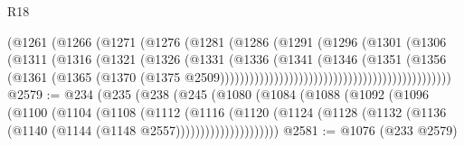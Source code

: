 \begin{lexlean}{R18}
\begin{coremodule}
                                                  (@1261
                                                    (@1266
                                                      (@1271
                                                        (@1276
                                                          (@1281
                                                            (@1286
                                                              (@1291
                                                                (@1296
                                                                  (@1301
                                                                    (@1306
                                                                      (@1311
                                                                        (@1316
                                                                          (@1321
                                                                            (@1326
                                                                              (@1331
                                                                                (@1336
                                                                                  (@1341
                                                                                    (@1346
                                                                                      (@1351
                                                                                        (@1356
                                                                                          (@1361
                                                                                            (@1365
                                                                                              (@1370
                                                                                                (@1375
                                                                                                  @2509)))))))))))))))))))))))))))))))))))))))))))))))
@2579 := @234
    (@235
      (@238
        (@245
          (@1080
            (@1084
              (@1088
                (@1092
                  (@1096
                    (@1100
                      (@1104
                        (@1108
                          (@1112
                            (@1116
                              (@1120
                                (@1124
                                  (@1128
                                    (@1132 (@1136 (@1140 (@1144 (@1148 @2557)))))))))))))))))))))
@2581 := @1076 (@233 @2579)

\end{coremodule}
\end{lexlean}
